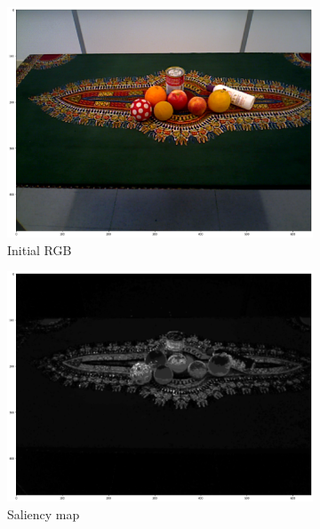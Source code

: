 \begin{figure}
    \begin{subfigure}[t]{0.16\linewidth}
        \centering
        \includegraphics[width=\textwidth]{figures/methods1.png}
        \caption{Initial RGB}
        \label{methods:pic1}
    \end{subfigure}
    \hfill
    \begin{subfigure}[t]{0.16\linewidth}
        \centering
        \includegraphics[width=\textwidth]{figures/methods2.png}
        \caption{Saliency map}
        \label{methods:pic2}
    \end{subfigure}
    \hfill
    \begin{subfigure}[t]{0.16\linewidth}
        \centering

\end{subfigure}
\end{figure}
